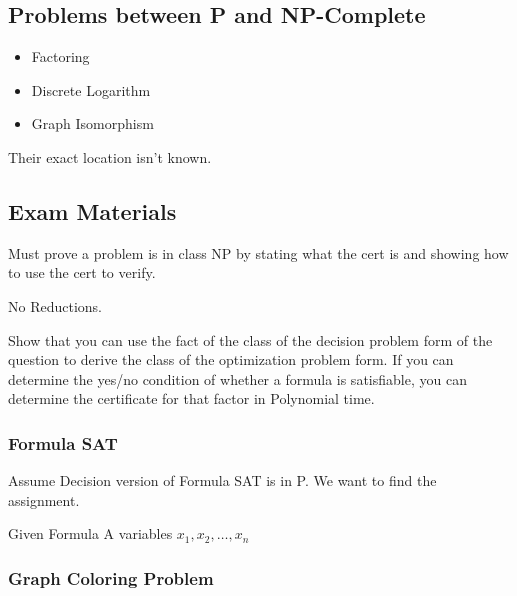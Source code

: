 \documentclass[english, 10pt]{article}
\begin{document}
\subsection{Problems between P and NP-Complete}

\begin{itemize}
    \item Factoring
    \item Discrete Logarithm
    \item Graph Isomorphism
\end{itemize}

Their exact location isn't known.

\subsection{Exam Materials}

Must prove a problem is in class NP by stating what the cert is and showing how to use the cert to verify.

No Reductions.

Show that you can use the fact of the class of the decision problem form of the
question to derive the class of the optimization problem form.  If you can
determine the yes/no condition of whether a formula is satisfiable, you can
determine the certificate for that factor in Polynomial time.

\subsubsection{Formula SAT}
Assume Decision version of Formula SAT is in P. We want to find the assignment.

Given Formula A variables $x_1, x_2, \ldots , x_n$

\begin{algorithm}
    \;
\end{algorithm}

\subsubsection{Graph Coloring Problem}
\end{document}
